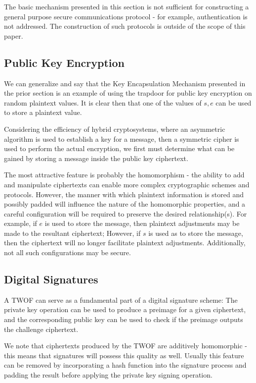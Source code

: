 \documentclass[preprint]{iacrtrans}
\begin{document}
The basic mechanism presented in this section is not sufficient for constructing a general purpose secure communications protocol - for example, authentication is not addressed. The construction of such protocols is outside of the scope of this paper. 

\subsection{Public Key Encryption}
We can generalize and say that the Key Encapsulation Mechanism presented in the prior section is an example of using the trapdoor for public key encryption on random plaintext values. It is clear then that one of the values of $s, e$ can be used to store a plaintext value.

Considering the efficiency of hybrid cryptosystems, where an asymmetric algorithm is used to establish a key for a message, then a symmetric cipher is used to perform the actual encryption, we first must determine what can be gained by storing a message inside the public key ciphertext.

The most attractive feature is probably the homomorphism - the ability to add and manipulate ciphertexts can enable more complex cryptographic schemes and protocols. However, the manner with which plaintext information is stored and possibly padded will influence the nature of the homomorphic properties, and a careful configuration will be required to preserve the desired relationship(s). For example, if $e$ is used to store the message, then plaintext adjustments may be made to the resultant ciphertext; However, if $s$ is used as to store the message, then the ciphertext will no longer facilitate plaintext adjustments. Additionally, not all such configurations may be secure.

\subsection{Digital Signatures}
A TWOF can serve as a fundamental part of a digital signature scheme: The private key operation can be used to produce a preimage for a given ciphertext, and the corresponding public key can be used to check if the preimage outputs the challenge ciphertext. 

We note that ciphertexts produced by the TWOF are additively homomorphic - this means that signatures will possess this quality as well. Usually this feature can be removed by incorporating a hash function into the signature process and padding the result before applying the private key signing operation. 
\end{document}
